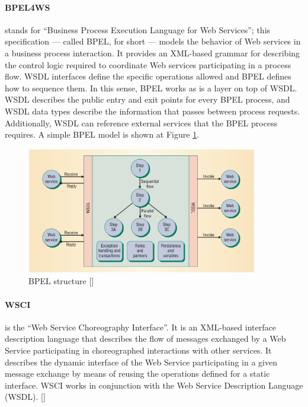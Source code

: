 \paragraph{BPEL4WS} 
stands for ``Business Process Execution Language for Web Services''; this specification — called BPEL, for short — models the behavior of Web services in a business process interaction. It provides an XML-based grammar for describing the control logic required to coordinate Web services participating in a process flow. WSDL interfaces define the specific operations allowed and BPEL defines how to sequence them. In this sense, BPEL works as is a layer on top of WSDL. WSDL describes the public entry and exit points for every BPEL process, and WSDL data types describe the information that passes between process requests. Additionally, WSDL can reference external services that the BPEL process requires. A simple BPEL model is shown at Figure \ref{BPELstructure}.

\begin{figure}[htb]
  \centering
  \includegraphics[width=0.9\textwidth]{images/BPELstructure}
  \caption{BPEL structure [\citet{WSOC}]}
  \label{BPELstructure}
\end{figure}

\paragraph{WSCI}
is the ``Web Service Choreography Interface''. It is an XML-based interface description language that describes the flow of messages exchanged by a Web Service participating in choreographed interactions with other services. It describes the dynamic interface of the Web Service participating in a given message exchange by means of reusing the operations defined for a static interface. WSCI works in conjunction with the Web Service Description Language (WSDL). [\citet{WSCI}]

